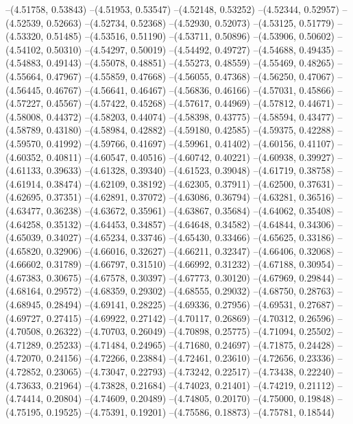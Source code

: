 --(4.51758, 0.53843)
--(4.51953, 0.53547)
--(4.52148, 0.53252)
--(4.52344, 0.52957)
--(4.52539, 0.52663)
--(4.52734, 0.52368)
--(4.52930, 0.52073)
--(4.53125, 0.51779)
--(4.53320, 0.51485)
--(4.53516, 0.51190)
--(4.53711, 0.50896)
--(4.53906, 0.50602)
--(4.54102, 0.50310)
--(4.54297, 0.50019)
--(4.54492, 0.49727)
--(4.54688, 0.49435)
--(4.54883, 0.49143)
--(4.55078, 0.48851)
--(4.55273, 0.48559)
--(4.55469, 0.48265)
--(4.55664, 0.47967)
--(4.55859, 0.47668)
--(4.56055, 0.47368)
--(4.56250, 0.47067)
--(4.56445, 0.46767)
--(4.56641, 0.46467)
--(4.56836, 0.46166)
--(4.57031, 0.45866)
--(4.57227, 0.45567)
--(4.57422, 0.45268)
--(4.57617, 0.44969)
--(4.57812, 0.44671)
--(4.58008, 0.44372)
--(4.58203, 0.44074)
--(4.58398, 0.43775)
--(4.58594, 0.43477)
--(4.58789, 0.43180)
--(4.58984, 0.42882)
--(4.59180, 0.42585)
--(4.59375, 0.42288)
--(4.59570, 0.41992)
--(4.59766, 0.41697)
--(4.59961, 0.41402)
--(4.60156, 0.41107)
--(4.60352, 0.40811)
--(4.60547, 0.40516)
--(4.60742, 0.40221)
--(4.60938, 0.39927)
--(4.61133, 0.39633)
--(4.61328, 0.39340)
--(4.61523, 0.39048)
--(4.61719, 0.38758)
--(4.61914, 0.38474)
--(4.62109, 0.38192)
--(4.62305, 0.37911)
--(4.62500, 0.37631)
--(4.62695, 0.37351)
--(4.62891, 0.37072)
--(4.63086, 0.36794)
--(4.63281, 0.36516)
--(4.63477, 0.36238)
--(4.63672, 0.35961)
--(4.63867, 0.35684)
--(4.64062, 0.35408)
--(4.64258, 0.35132)
--(4.64453, 0.34857)
--(4.64648, 0.34582)
--(4.64844, 0.34306)
--(4.65039, 0.34027)
--(4.65234, 0.33746)
--(4.65430, 0.33466)
--(4.65625, 0.33186)
--(4.65820, 0.32906)
--(4.66016, 0.32627)
--(4.66211, 0.32347)
--(4.66406, 0.32068)
--(4.66602, 0.31789)
--(4.66797, 0.31510)
--(4.66992, 0.31232)
--(4.67188, 0.30954)
--(4.67383, 0.30675)
--(4.67578, 0.30397)
--(4.67773, 0.30120)
--(4.67969, 0.29844)
--(4.68164, 0.29572)
--(4.68359, 0.29302)
--(4.68555, 0.29032)
--(4.68750, 0.28763)
--(4.68945, 0.28494)
--(4.69141, 0.28225)
--(4.69336, 0.27956)
--(4.69531, 0.27687)
--(4.69727, 0.27415)
--(4.69922, 0.27142)
--(4.70117, 0.26869)
--(4.70312, 0.26596)
--(4.70508, 0.26322)
--(4.70703, 0.26049)
--(4.70898, 0.25775)
--(4.71094, 0.25502)
--(4.71289, 0.25233)
--(4.71484, 0.24965)
--(4.71680, 0.24697)
--(4.71875, 0.24428)
--(4.72070, 0.24156)
--(4.72266, 0.23884)
--(4.72461, 0.23610)
--(4.72656, 0.23336)
--(4.72852, 0.23065)
--(4.73047, 0.22793)
--(4.73242, 0.22517)
--(4.73438, 0.22240)
--(4.73633, 0.21964)
--(4.73828, 0.21684)
--(4.74023, 0.21401)
--(4.74219, 0.21112)
--(4.74414, 0.20804)
--(4.74609, 0.20489)
--(4.74805, 0.20170)
--(4.75000, 0.19848)
--(4.75195, 0.19525)
--(4.75391, 0.19201)
--(4.75586, 0.18873)
--(4.75781, 0.18544)
